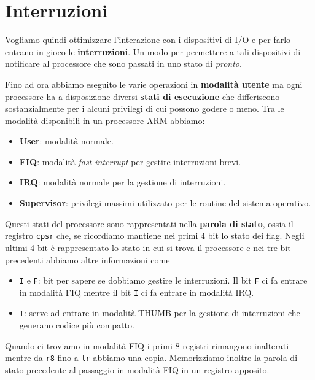 \section{Interruzioni}
Vogliamo quindi ottimizzare l'interazione con i dispositivi di I/O e per farlo entrano in gioco le
\textbf{interruzioni}. Un modo per permettere a tali dispositivi di notificare al processore che
sono passati in uno stato di \emph{pronto}.

Fino ad ora abbiamo eseguito le varie operazioni in \textbf{modalità utente} ma ogni processore ha
a disposizione diversi \textbf{stati di esecuzione} che differiscono sostanzialmente per i alcuni
privilegi di cui possono godere o meno. Tra le modalità disponibili in un processore ARM abbiamo:
\begin{itemize}
	\item \textbf{User}: modalità normale.
	\item \textbf{FIQ}: modalità \emph{fast interrupt} per gestire interruzioni brevi.
	\item \textbf{IRQ}: modalità normale per la gestione di interruzioni.
	\item \textbf{Supervisor}: privilegi massimi utilizzato per le routine del sistema operativo.
\end{itemize}
Questi stati del processore sono rappresentati nella \textbf{parola di stato}, ossia il registro
\verb|cpsr| che, se ricordiamo mantiene nei primi 4 bit lo stato dei flag. Negli ultimi 4 bit è
rappresentato lo stato in cui si trova il processore e nei tre bit precedenti abbiamo altre
informazioni come
\begin{itemize}
	\item \verb|I| e \verb|F|: bit per sapere se dobbiamo gestire le interruzioni. Il bit \verb|F|
	      ci fa entrare in modalità FIQ mentre il bit \verb|I| ci fa entrare in modalità IRQ.
	\item \verb|T|: serve ad entrare in modalità THUMB per la gestione di interruzioni che generano
	      codice più compatto.
\end{itemize}
Quando ci troviamo in modalità FIQ i primi 8 registri rimangono inalterati mentre da \verb|r8| fino
a \verb|lr| abbiamo una copia. Memorizziamo inoltre la parola di stato precedente al passaggio in
modalità FIQ in un registro apposito.


